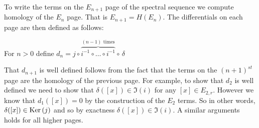 To write the terms on the $E_{n+1}$ page of the spectral sequence we compute homology of the $E_{n}$ page. 
That is $E_{n+1} = H(E_n)$. 
The differentials on each page are then defined as follows:
\begin{definition} For $n > 0$ define $d_n = j \circ \overbrace{i^{-1} \circ \ldots \circ i^{-1}}^{(n-1)\textrm{ times}} \circ\, \delta$
\end{definition}
That $d_{n+1}$ is well defined follows from the fact that the terms on the $(n+1)^{st}$ page are the homology of the previous page. For example, to show that $d_2$ is well defined we need to show that $\delta([x]) \in \Im(i)$ for any $[x] \in E_{2,r}$. However we know that $d_1([x]) = 0$ by the construction of the $E_2$ terms. So in other words, $\delta([x]) \in \operatorname{Ker}{(j)}$ and so by exactness $\delta([x]) \in \Im(i)$. A similar arguments holds for all higher pages.

